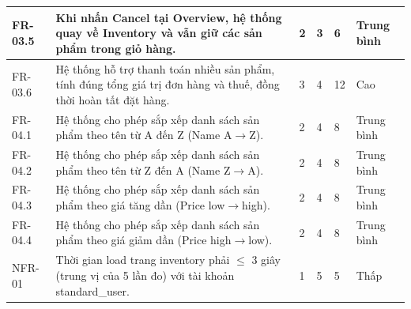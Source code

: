 {\begin{longtable}{|L{1.7cm}|L{8.0cm}|C{0.8cm}|C{0.8cm}|C{0.8cm}|L{2.3cm}|}
\hline
FR-03.5 & Khi nhấn Cancel tại Overview, hệ thống quay về Inventory và vẫn giữ các sản phẩm trong giỏ hàng. & 2 & 3 & 6 & Trung bình \\
\hline
FR-03.6 & Hệ thống hỗ trợ thanh toán nhiều sản phẩm, tính đúng tổng giá trị đơn hàng và thuế, đồng thời hoàn tất đặt hàng. & 3 & 4 & 12 & Cao \\
\hline
FR-04.1 & Hệ thống cho phép sắp xếp danh sách sản phẩm theo tên từ A đến Z (Name A$\rightarrow$Z). & 2 & 4 & 8 & Trung bình \\
\hline
FR-04.2 & Hệ thống cho phép sắp xếp danh sách sản phẩm theo tên từ Z đến A (Name Z$\rightarrow$A). & 2 & 4 & 8 & Trung bình \\
\hline
FR-04.3 & Hệ thống cho phép sắp xếp danh sách sản phẩm theo giá tăng dần (Price low$\rightarrow$high). & 2 & 4 & 8 & Trung bình \\
\hline
FR-04.4 & Hệ thống cho phép sắp xếp danh sách sản phẩm theo giá giảm dần (Price high$\rightarrow$low). & 2 & 4 & 8 & Trung bình \\
\hline
NFR-01 & Thời gian load trang inventory phải $\leq$ 3 giây (trung vị của 5 lần đo) với tài khoản standard\_\allowbreak{}user. & 1 & 5 & 5 & Thấp \\
\hline
\end{longtable}
}
